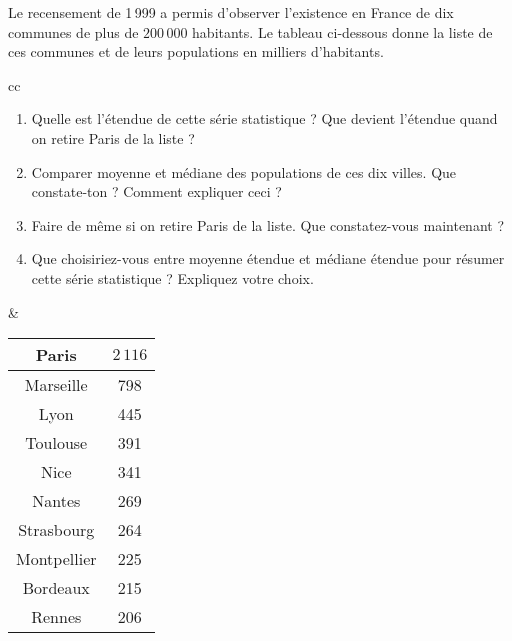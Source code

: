 \begin{exo}
  Le recensement de 1\,999 a permis d'observer l'existence en France de dix communes
de plus de $200\, 000$ habitants. Le tableau ci-dessous donne la liste de ces communes et
de leurs populations en milliers d'habitants.

\begin{tabular}{cc}
 \begin{minipage}[l]{0.70\linewidth}

\begin{enumerate}
	\item Quelle est l'\'etendue de cette s\'erie statistique ? Que devient l'\'etendue quand on
retire Paris de la liste ?
\item Comparer moyenne et m\'ediane des populations de ces dix villes. Que constate-ton
? Comment expliquer ceci ?
\item Faire de m\^eme si on retire Paris de la liste. Que constatez-vous maintenant ?
\item Que choisiriez-vous entre \og moyenne \'etendue \fg et \og m\'ediane \'etendue \fg pour
r\'esumer cette s\'erie statistique ? Expliquez votre choix.
\end{enumerate}
 \end{minipage}
 &
 \begin{minipage}[r]{0.30\linewidth}
  \begin{center}
\begin{tabular}{|c|c|}
\hline
Paris & $2\,116$ \\ \hline
Marseille & 798 \\ \hline
Lyon & 445 \\ \hline
Toulouse & 391 \\ \hline
Nice & 341 \\ \hline
Nantes & 269 \\ \hline
Strasbourg & 264 \\ \hline
Montpellier & 225 \\ \hline
Bordeaux & 215 \\ \hline
Rennes & 206 \\ \hline
\end{tabular}
\end{center}
 \end{minipage}
\end{tabular}



\end{exo}

